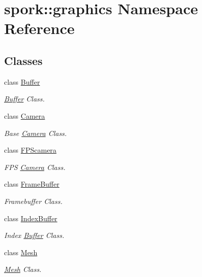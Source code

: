 \hypertarget{namespacespork_1_1graphics}{}\section{spork\+:\+:graphics Namespace Reference}
\label{namespacespork_1_1graphics}
\subsection*{Classes}
\begin{DoxyCompactItemize}
\item 
class \hyperlink{classspork_1_1graphics_1_1_buffer}{Buffer}
\begin{DoxyCompactList}\small\item\em \hyperlink{classspork_1_1graphics_1_1_buffer}{Buffer} Class. \end{DoxyCompactList}\item 
class \hyperlink{classspork_1_1graphics_1_1_camera}{Camera}
\begin{DoxyCompactList}\small\item\em Base \hyperlink{classspork_1_1graphics_1_1_camera}{Camera} Class. \end{DoxyCompactList}\item 
class \hyperlink{classspork_1_1graphics_1_1_f_p_scamera}{F\+P\+Scamera}
\begin{DoxyCompactList}\small\item\em F\+PS \hyperlink{classspork_1_1graphics_1_1_camera}{Camera} Class. \end{DoxyCompactList}\item 
class \hyperlink{classspork_1_1graphics_1_1_frame_buffer}{Frame\+Buffer}
\begin{DoxyCompactList}\small\item\em Framebuffer Class. \end{DoxyCompactList}\item 
class \hyperlink{classspork_1_1graphics_1_1_index_buffer}{Index\+Buffer}
\begin{DoxyCompactList}\small\item\em Index \hyperlink{classspork_1_1graphics_1_1_buffer}{Buffer} Class. \end{DoxyCompactList}\item 
class \hyperlink{classspork_1_1graphics_1_1_mesh}{Mesh}
\begin{DoxyCompactList}\small\item\em \hyperlink{classspork_1_1graphics_1_1_mesh}{Mesh} Class. \end{DoxyCompactList}\item 

\end{DoxyCompactItemize}
